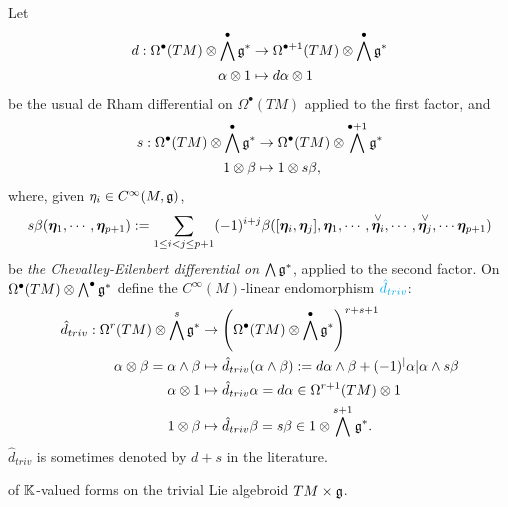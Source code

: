 \begin{definition}
Let
\begin{align}
    d: \Omega^\bullet(TM) \otimes \bigwedge^\bullet \mathfrak{g}^* &\to \Omega^{\bullet+1}(TM) \otimes \bigwedge^\bullet \mathfrak{g}^*\\
    \alpha \otimes 1 &\mapsto d\alpha \otimes 1
\end{align}
be the usual de Rham differential on $\Omega^\bullet(TM)$ applied to the first factor, and
\begin{align*}
    s: \Omega^\bullet(TM) \otimes \bigwedge^\bullet \mathfrak{g}^* &\to \Omega^\bullet(TM) \otimes \bigwedge^{\bullet+1} \mathfrak{g}^* \\
    1 \otimes \beta &\mapsto 1 \otimes s\beta, 
\end{align*} where, given $\eta_i \in C^\infty(M, \mathfrak{g})$,
\begin{multline}
    s\beta(\bm{\eta}_1, \cdots, \bm{\eta}_{p+1}) := \sum_{1 \leq i < j \leq p+1} (-1)^{i+j} \beta([\bm{\eta}_i, \bm{\eta}_j], \bm{\eta}_1, \cdots, \overset{\vee}{\bm{\eta}_i}, \cdots, \overset{\vee}{\bm{\eta}_j}, \cdots \bm{\eta}_{p+1})
\end{multline}
be \emph{the Chevalley-Eilenbert differential on $\bigwedge \mathfrak{g}^*$}, applied to the second factor. On $\Omega^\bullet(TM) \otimes \bigwedge^\bullet \mathfrak{g}^*$ define the $C^\infty(M)$-linear endomorphism $\textcolor{cyan}{\hat d_{triv}}$:
\begin{align}
    \hat d_{triv}: \Omega^r(TM) \otimes \bigwedge^s \mathfrak{g}^* &\to \left( \Omega^\bullet(TM) \otimes \bigwedge^\bullet \mathfrak{g}^*\right)^{r+s+1} \\
    \alpha \otimes \beta = \alpha \wedge \beta &\mapsto  \hat d_{triv} (\alpha \wedge \beta) := d\alpha \wedge \beta + (-1)^|\alpha| \alpha \wedge s\beta \\
    \alpha \otimes 1 &\mapsto \hat d_{triv}\alpha = d\alpha \in \Omega^{r+1}(TM) \otimes 1 \\
    1 \otimes \beta &\mapsto \hat d_{triv}\beta = s\beta \in 1 \otimes \bigwedge^{s+1} \mathfrak{g}^*.
\end{align} $\hat d_{triv}$ is sometimes denoted by $d+s$ in the literature.

\end{definition}

\begin{theorem}\label{theoIsoScalarFormsTLA}
 of $\mathbb{K}$-valued forms on the trivial Lie algebroid $TM \times \mathfrak{g}$.
\end{theorem}

